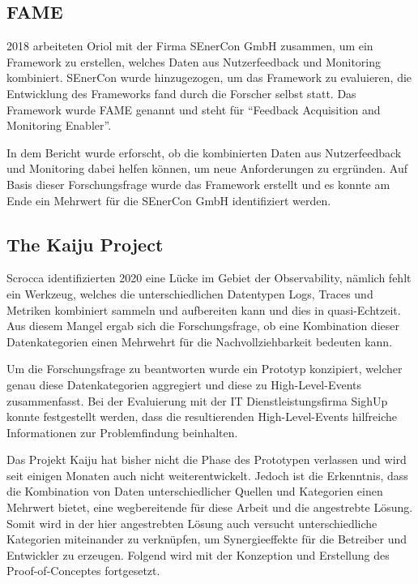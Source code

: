 \subsection{FAME}
\label{sec:fame}

2018 arbeiteten Oriol \etal \cite{FamePaper} mit der Firma SEnerCon GmbH zusammen, um ein Framework zu erstellen, welches Daten aus Nutzerfeedback und Monitoring kombiniert. SEnerCon wurde hinzugezogen, um das Framework zu evaluieren, die Entwicklung des Frameworks fand durch die Forscher selbst statt. Das Framework wurde FAME\footnotemark{} genannt und steht für \enquote{Feedback Acquisition and Monitoring Enabler}.


In dem Bericht wurde erforscht, ob die kombinierten Daten aus Nutzerfeedback und Monitoring dabei helfen können, um neue Anforderungen zu ergründen. Auf Basis dieser Forschungsfrage wurde das Framework erstellt und es konnte am Ende ein Mehrwert für die SEnerCon GmbH identifiziert werden.

\subsection{The Kaiju Project}
\label{sec:kaiju}

Scrocca \etal \cite{TheKaijuProjectPaper} identifizierten 2020 eine Lücke im Gebiet der Observability, nämlich fehlt ein Werkzeug, welches die unterschiedlichen Datentypen Logs, Traces und Metriken kombiniert sammeln und aufbereiten kann und dies in quasi-Echtzeit. Aus diesem Mangel ergab sich die Forschungsfrage, ob eine Kombination dieser Datenkategorien einen Mehrwehrt für die Nachvollziehbarkeit bedeuten kann.

Um die Forschungsfrage zu beantworten wurde ein Prototyp konzipiert, welcher genau diese Datenkategorien aggregiert und diese zu High-Level-Events zusammenfasst. Bei der Evaluierung mit der IT Dienstleistungsfirma SighUp konnte festgestellt werden, dass die resultierenden High-Level-Events hilfreiche Informationen zur Problemfindung beinhalten.

Das Projekt Kaiju hat bisher nicht die Phase des Prototypen verlassen und wird seit einigen Monaten auch nicht weiterentwickelt\footnotemark{}. Jedoch ist die Erkenntnis, dass die Kombination von Daten unterschiedlicher Quellen und Kategorien einen Mehrwert bietet, eine wegbereitende für diese Arbeit und die angestrebte Lösung. Somit wird in der hier angestrebten Lösung auch versucht unterschiedliche Kategorien miteinander zu verknüpfen, um Synergieeffekte für die Betreiber und Entwickler zu erzeugen. Folgend wird mit der Konzeption und Erstellung des Proof-of-Conceptes fortgesetzt.

